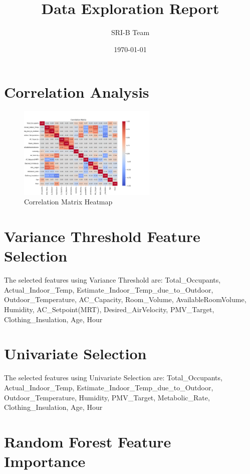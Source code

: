 \documentclass{article}%
\title{Data Exploration Report}%
\author{SRI{-}B Team}%
\date{\today}%
\begin{document}
%
\normalsize%
\maketitle%
\section{Correlation Analysis}%
\label{sec:CorrelationAnalysis}%

%


\begin{figure}[h!]%
\centering%
\includegraphics[width=250px]{correlation_matrix.png}%
\caption{Correlation Matrix Heatmap}%
\end{figure}

%
\section{Variance Threshold Feature Selection}%
\label{sec:VarianceThresholdFeatureSelection}%

%
The selected features using Variance Threshold are: Total\_Occupants, Actual\_Indoor\_Temp, Estimate\_Indoor\_Temp\_due\_to\_Outdoor, Outdoor\_Temperature, AC\_Capacity, Room\_Volume, AvailableRoomVolume, Humidity, AC\_Setpoint(MRT), Desired\_AirVelocity, PMV\_Target, Clothing\_Insulation, Age, Hour%
\section{Univariate Selection}%
\label{sec:UnivariateSelection}%

%
The selected features using Univariate Selection are: Total\_Occupants, Actual\_Indoor\_Temp, Estimate\_Indoor\_Temp\_due\_to\_Outdoor, Outdoor\_Temperature, Humidity, PMV\_Target, Metabolic\_Rate, Clothing\_Insulation, Age, Hour%
\section{Random Forest Feature Importance}%
\label{sec:RandomForestFeatureImportance}%
\end{document}
